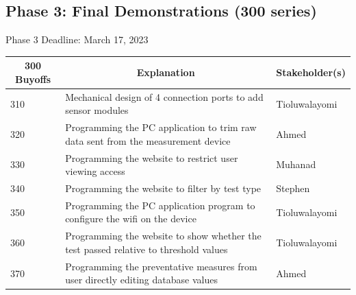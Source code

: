 \documentclass[12pt]{article}
\begin{document}
\noindent
\subsection{Phase 3: Final Demonstrations (300 series)}
Phase 3 Deadline: March 17, 2023\\

\begin{table}[H]
  \centering
  \begin{tabular}{|p{2cm}|p{10cm}|p{2cm}|}
  \hline
  \multicolumn{1}{|c|}{\textbf{300 Buyoffs}} & \multicolumn{1}{c|}{\textbf{Explanation}} & \multicolumn{1}{|c|}{\textbf{Stakeholder(s)}}
  \\ \hline
  310
  & Mechanical design of 4 connection ports to add sensor modules
  & Tioluwalayomi
  \newline                                
  \\ \hline

  320
  & Programming the PC application to trim raw data sent from the measurement device
  & Ahmed
  \newline                                
  \\ \hline

  330                              
  & Programming the website to restrict user viewing access
  & Muhanad
  \newline                                
  \\ \hline

  340
  & Programming the website to filter by test type
  & Stephen
  \newline                                
  \\ \hline

  350                          
  & Programming the PC application program to configure the wifi on the device
  & Tioluwalayomi
  \newline                                
  \\ \hline

  360                                
  & Programming the website to show whether the test passed relative to threshold values
  & Tioluwalayomi 
  \newline                            
  \\ \hline

  370                                
  & Programming the preventative measures from user directly editing database values
  & Ahmed 
  \newline    
  \\ \hline


\end{tabular}
\end{table}
\end{document}
